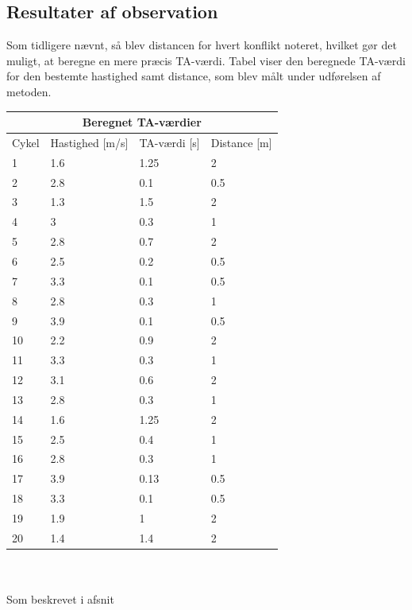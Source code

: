 \subsection{Resultater af observation}
\label{sub:def_konflikt}
Som tidligere nævnt, så blev distancen for hvert konflikt noteret, hvilket gør det muligt, at beregne en mere præcis TA-værdi. Tabel %
viser den beregnede TA-værdi for den bestemte hastighed samt distance, som blev målt under udførelsen af metoden.
\\
\begin{tabular}{ |p{1cm}|p{4cm}|p{4cm}|p{4cm}|  }
\hline
\multicolumn{4}{|c|}{Beregnet TA-værdier} \\
\hline
Cykel & Hastighed [m/s] & TA-værdi [s] & Distance [m] \\
\hline
1 & 1.6   & 1.25 & 2 \\
2 & 2.8 & 0.1 & 0.5 \\
3 & 1.3 & 1.5 & 2 \\
4 & 3  & 0.3 & 1 \\
5 & 2.8  & 0.7 & 2 \\
6 & 2.5   & 0.2 & 0.5 \\
7 & 3.3  & 0.1 & 0.5 \\
8 & 2.8  & 0.3 & 1 \\
9 & 3.9  & 0.1 & 0.5 \\
10 & 2.2  & 0.9   & 2 \\
11 & 3.3 & 0.3 &  1 \\
12 & 3.1 & 0.6 &   2\\
13 & 2.8 & 0.3 & 1\\
14 & 1.6  & 1.25   & 2\\
15 & 2.5  & 0.4 & 1\\
16 & 2.8 & 0.3 & 1\\
17 & 3.9 & 0.13 &0.5\\
18 & 3.3 & 0.1 & 0.5\\
19 & 1.9  & 1 & 2\\
20 & 1.4  & 1.4 & 2\\
\hline
\end{tabular}
\\\\
Som beskrevet i afsnit %

